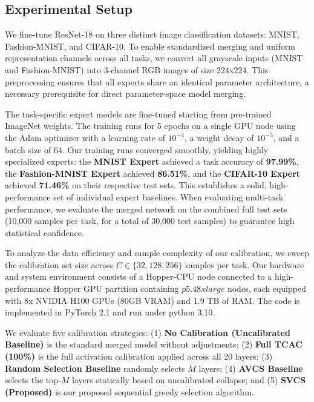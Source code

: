 \documentclass{article}
\theoremstyle{plain}
\theoremstyle{definition}
\theoremstyle{remark}
\begin{document}
\subsection{Experimental Setup}
We fine-tune ResNet-18 on three distinct image classification datasets: MNIST, Fashion-MNIST, and CIFAR-10. To enable standardized merging and uniform representation channels across all tasks, we convert all grayscale inputs (MNIST and Fashion-MNIST) into 3-channel RGB images of size 224x224. This preprocessing ensures that all experts share an identical parameter architecture, a necessary prerequisite for direct parameter-space model merging. 

The task-specific expert models are fine-tuned starting from pre-trained ImageNet weights. The training runs for 5 epochs on a single GPU node using the Adam optimizer with a learning rate of $10^{-4}$, a weight decay of $10^{-5}$, and a batch size of 64. Our training runs converged smoothly, yielding highly specialized experts: the \textbf{MNIST Expert} achieved a task accuracy of \textbf{97.99\%}, the \textbf{Fashion-MNIST Expert} achieved \textbf{86.51\%}, and the \textbf{CIFAR-10 Expert} achieved \textbf{71.46\%} on their respective test sets. This establishes a solid, high-performance set of individual expert baselines. When evaluating multi-task performance, we evaluate the merged network on the combined full test sets (10,000 samples per task, for a total of 30,000 test samples) to guarantee high statistical confidence.

To analyze the data efficiency and sample complexity of our calibration, we sweep the calibration set size across $C \in \{32, 128, 256\}$ samples per task. Our hardware and system environment consists of a Hopper-CPU node connected to a high-performance Hopper GPU partition containing $p5.48xlarge$ nodes, each equipped with 8x NVIDIA H100 GPUs (80GB VRAM) and 1.9 TB of RAM. The code is implemented in PyTorch 2.1 and run under python 3.10.

We evaluate five calibration strategies: (1) \textbf{No Calibration (Uncalibrated Baseline)} is the standard merged model without adjustments; (2) \textbf{Full TCAC (100\%)} is the full activation calibration applied across all 20 layers; (3) \textbf{Random Selection Baseline} randomly selects $M$ layers; (4) \textbf{AVCS Baseline} selects the top-$M$ layers statically based on uncalibrated collapse; and (5) \textbf{SVCS (Proposed)} is our proposed sequential greedy selection algorithm.
\end{document}
